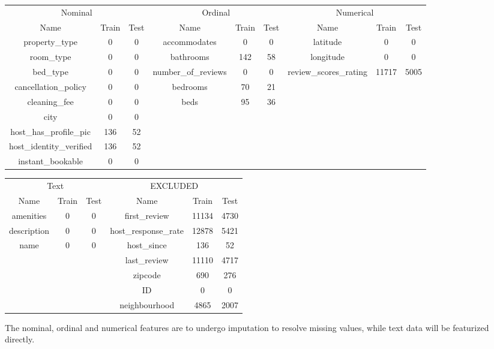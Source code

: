 \documentclass[11pt]{article}
\newcommand{\1}[1]{\mathbbm{1}_{#1}}
\begin{document}
\begin{center}
    \begin{tabular}{@{}ccccccccc@{}}\toprule
            \multicolumn{3}{c}{Nominal} & \multicolumn{3}{c}{Ordinal} & \multicolumn{3}{c}{Numerical}\\
            \cmidrule(lr){1-3}\cmidrule(lr){4-6}\cmidrule(lr){7-9}
        Name & Train & Test & Name & Train & Test & Name & Train & Test \\\midrule
        property\_type & 0 & 0 & accommodates & 0 & 0 & latitude & 0 & 0\\ 
        room\_type & 0 & 0 &  bathrooms & 142 & 58 & longitude & 0 & 0\\
        bed\_type & 0 & 0 & number\_of\_reviews & 0 & 0 & review\_scores\_rating & 11717 & 5005\\
        cancellation\_policy & 0 & 0 & bedrooms & 70 & 21 & & &\\
        cleaning\_fee& 0 & 0 & beds & 95 & 36 & & &\\
        city& 0 & 0 & & & & & &\\
        host\_has\_profile\_pic& 136 & 52 & & & & & &\\
        host\_identity\_verified& 136 & 52 & & & & & &\\
        instant\_bookable& 0 & 0 & & & & & &\\
        \bottomrule
    \end{tabular}
    \begin{tabular}{@{}cccccc@{}}
            \multicolumn{3}{c}{Text} & \multicolumn{3}{c}{EXCLUDED} \\
            \cmidrule(lr){1-3}\cmidrule(lr){4-6}
        Name & Train & Test & Name & Train & Test\\\midrule
        amenities & 0 & 0 &first\_review & 11134 & 4730\\
        description & 0 & 0 & host\_response\_rate & 12878 & 5421\\
        name & 0 & 0 & host\_since & 136 & 52\\
        & & & last\_review & 11110 & 4717\\
        & & & zipcode & 690 & 276\\
        & & & ID & 0 & 0\\
        & & & neighbourhood & 4865 & 2007\\
        \bottomrule
    \end{tabular}
\end{center}
The nominal, ordinal and numerical features are to undergo imputation to resolve missing values, while text data will be featurized directly.
\end{document}
